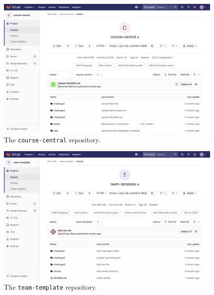 \documentclass[12pt,twoside]{mitthesis}
\begin{document}
\begin{figure}[H]
\centering
\includegraphics[scale=0.3]{fig-course-central.png}
\caption{\label{fig-course-central} The \texttt{course-central} repository.}
\end{figure}

\begin{figure}[H]
\centering
\includegraphics[scale=0.3]{fig-team-template.png}
\caption{\label{fig-team-template} The \texttt{team-template} repository.}
\end{figure}
\end{document}
